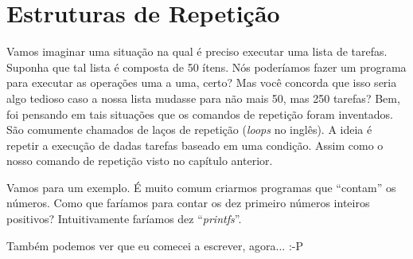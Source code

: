 \chapter{Estruturas de Repetição}
Vamos imaginar uma situação na qual é preciso executar uma lista de tarefas. Suponha que tal lista é composta de 50 ítens. Nós poderíamos fazer um programa para executar as operações uma a uma, certo? Mas você concorda que isso seria algo tedioso caso a nossa lista mudasse para não mais 50, mas 250 tarefas? Bem, foi pensando em tais situações que os comandos de repetição foram inventados. São comumente chamados de laços de repetição (\textit{loops} no inglês). A ideia é repetir a execução de dadas tarefas baseado em uma condição. Assim como o nosso comando de repetição visto no capítulo anterior.

Vamos para um exemplo. É muito comum criarmos programas que ``contam'' os números. Como que faríamos para contar os dez primeiro números inteiros positivos? Intuitivamente faríamos dez ``\textit{printfs}''. 

Também podemos ver que eu comecei a escrever, agora... :-P